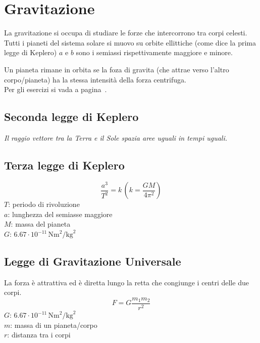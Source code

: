 
\section{Gravitazione}\label{sec:gravitazione}
La gravitazione si occupa di studiare le forze che intercorrono tra corpi celesti.\\ 
Tutti i pianeti del sistema solare si muovo su orbite ellittiche (come dice la prima legge di 
Keplero) $a$ e $b$ sono i semiassi rispettivamente maggiore e minore.
\begin{center}
\end{center}
Un pianeta rimane in orbita se la foza di gravita (che attrae verso l'altro corpo/pianeta) ha la 
stessa intensità della forza centrifuga.\\
Per gli esercizi si vada a pagina~\pageref{ex:gravitazione}.

\subsection{Seconda legge di Keplero}
\textit{Il raggio vettore tra la Terra e il Sole spazia aree uguali in tempi uguali.}

\subsection{Terza legge di Keplero}
\begin{equation*}
\frac{a^3}{T^2} = k\,\left(k = \frac{GM}{4\pi^2}\right)
\end{equation*}
$T$: periodo di rivoluzione\\
$a$: lunghezza del semiasse maggiore\\
$M$: massa del pianeta\\
\hyperref[tab:G]{$G$}: $6.67\cdot10^{-11}\,\text{Nm}^2\text{/kg}^2$

\subsection{Legge di Gravitazione Universale}
La forza è attrattiva ed è diretta lungo la retta che congiunge i centri delle due corpi.
\begin{equation*}
F = G\frac{m_1m_2}{r^2}
\end{equation*}
\hyperref[tab:G]{$G$}: $6.67\cdot10^{-11}\,\text{Nm}^2\text{/kg}^2$\\
$m$: massa di un pianeta/corpo\\
$r$: distanza tra i corpi

